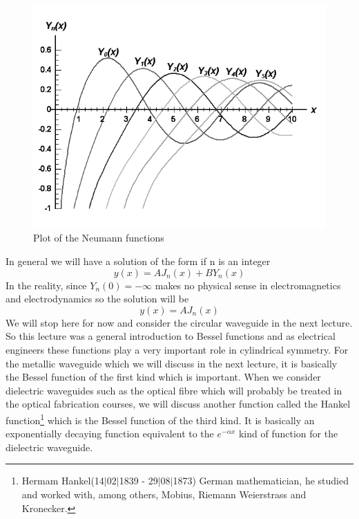 \begin{figure}[h]
\centering
\includegraphics[width=1\linewidth]{./graphics/BesselY_800}
\caption{ Plot of the Neumann functions}
\label{fig:fig-3}
\end{figure}
In general we will have a solution of the form if n is an integer
$$y(x) = AJ_n(x) + B Y_n(x)$$
In the reality, since $Y_n(0) = -\infty$ makes no physical sense in electromagnetics and electrodynamics so the solution will be 
$$y(x) = AJ_n(x)$$
We will stop here for now and consider the circular waveguide in the next lecture. So this lecture was a general introduction to Bessel functions and as electrical engineers these functions play a very important role in cylindrical symmetry. For the metallic waveguide which we will discuss in the next lecture, it is basically the Bessel function of the first kind which is important. When we consider dielectric waveguides such as the optical fibre which will probably be treated in the optical fabrication courses, we will discuss another function called the Hankel function\footnote{Hermam Hankel(14$|$02$|$1839 - 29$|$08$|$1873) German mathematician, he studied and worked with, among others, Mobius, Riemann Weierstrass and Kronecker.} which is the Bessel function of the third kind. It is basically an exponentially decaying function equivalent to the $e^{-\alpha x}$ kind of function for the dielectric waveguide.
